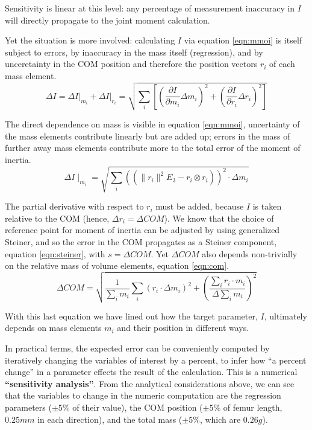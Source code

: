 Sensitivity is linear at this level: any percentage of measurement inaccuracy in \(I\) will directly propagate to the joint moment calculation.


Yet the situation is more involved: calculating \(I\) via equation \eqref{eqn:mmoi} is itself subject to errors, by inaccuracy in the mass itself (regression), and by unceretainty in the COM position and therefore the position vectors \(r_{i}\) of each mass element.
\[ \Delta I = \left. \Delta I \right|_{m_i} + \left. \Delta I \right|_{r_i} = \sqrt{ \sum_{i} \left[ \left(\frac{\partial I}{\partial m_{i}} \Delta m_{i} \right)^2 + \left(\frac{\partial I}{\partial r_{i}} \Delta r_{i}\right)^2 \right] }\]


The direct dependence on mass is visible in equation \eqref{eqn:mmoi}, uncertainty of the mass elements contribute linearly but are added up; errors in the mass of further away mass elements contribute more to the total error of the moment of inertia.
\[ \Delta I \mid_{m_i} = \sqrt{\sum\limits_{i}\left(\left( \lVert r_{i} \rVert ^2 E_3 - r_{i} \otimes r_{i} \right)\right)^2 \cdot \Delta m_{i} }\]


The partial derivative with respect to \(r_{i}\) must be added, because \(I\) is taken relative to the COM (hence, \(\Delta r_i = \Delta COM\)).
We know that the choice of reference point for moment of inertia can be adjusted by using generalized Steiner, and so the error in the COM propagates as a Steiner component, equation \eqref{eqn:steiner}, with \(s=\Delta COM\).
Yet \(\Delta COM\) also depends non-trivially on the relative mass of volume elements, equation \eqref{eqn:com}.
\[ \Delta COM = \sqrt{ \frac{1}{\sum_i m_{i}} \sum\limits_{i} \left( r_{i} \cdot \Delta m_{i} \right)^2  + \left( \frac{ \sum\limits_{i} r_{i} \cdot m_{i} }{\Delta \sum_i m_{i} }\right)^{2}}\]


With this last equation we have lined out how the target parameter, \(I\), ultimately depends on mass elements \(m_{i}\) and their position in different ways.


In practical terms, the expected error can be conveniently computed by iteratively changing the variables of interest by a percent, to infer how ``a percent change'' in a parameter effects the result of the calculation.
This is a numerical \textbf{``sensitivity analysis''}.
From the analytical considerations above, we can see that the variables to change in the numeric computation are the regression parameters (\(\pm 5\%\) of their value), the COM position (\(\pm 5\%\) of femur length, \(0.25 mm\) in each direction), and the total mass (\(\pm 5\%\), which are \(0.26 g\)).


